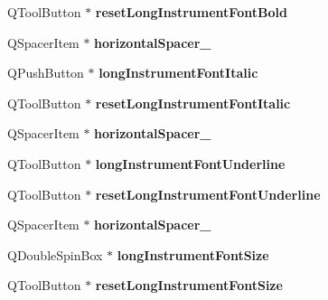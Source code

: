 \begin{DoxyCompactItemize}
Q\+Tool\+Button $\ast$ {\bfseries reset\+Long\+Instrument\+Font\+Bold}
\item 
\mbox{\label{class_ui___edit_style_base_ac464b98acc7873b92b2b8b70ff035d1a}} 
Q\+Spacer\+Item $\ast$ {\bfseries horizontal\+Spacer\+\_}
\item 
\mbox{\label{class_ui___edit_style_base_a8147e61bf90f361d9da1090d1f7d5b38}} 
Q\+Push\+Button $\ast$ {\bfseries long\+Instrument\+Font\+Italic}
\item 
\mbox{\label{class_ui___edit_style_base_a09709bd9813829bd9c4768d2fe1d0566}} 
Q\+Tool\+Button $\ast$ {\bfseries reset\+Long\+Instrument\+Font\+Italic}
\item 
\mbox{\label{class_ui___edit_style_base_a06706a166a6ec855f7fde09c1df2c2ff}} 
Q\+Spacer\+Item $\ast$ {\bfseries horizontal\+Spacer\+\_}
\item 
\mbox{\label{class_ui___edit_style_base_abb6a97ec805356cbf15549408db1d1d6}} 
Q\+Tool\+Button $\ast$ {\bfseries long\+Instrument\+Font\+Underline}
\item 
\mbox{\label{class_ui___edit_style_base_a58d594bbb618b55c47adcffb09b74ea2}} 
Q\+Tool\+Button $\ast$ {\bfseries reset\+Long\+Instrument\+Font\+Underline}
\item 
\mbox{\label{class_ui___edit_style_base_a16b0c5ff5a1692fdc2617b538de8d05f}} 
Q\+Spacer\+Item $\ast$ {\bfseries horizontal\+Spacer\+\_}
\item 
\mbox{\label{class_ui___edit_style_base_a3994723243a5e50570c4f80e1130c9e9}} 
Q\+Double\+Spin\+Box $\ast$ {\bfseries long\+Instrument\+Font\+Size}
\item 
\mbox{\label{class_ui___edit_style_base_a538b04676f6853baf921917c7374314c}} 
Q\+Tool\+Button $\ast$ {\bfseries reset\+Long\+Instrument\+Font\+Size}
\item 
\mbox{\label{class_ui___edit_style_base_a8f4125e6c63ec5d70ab933680f4ee522}} 

\end{DoxyCompactItemize}
